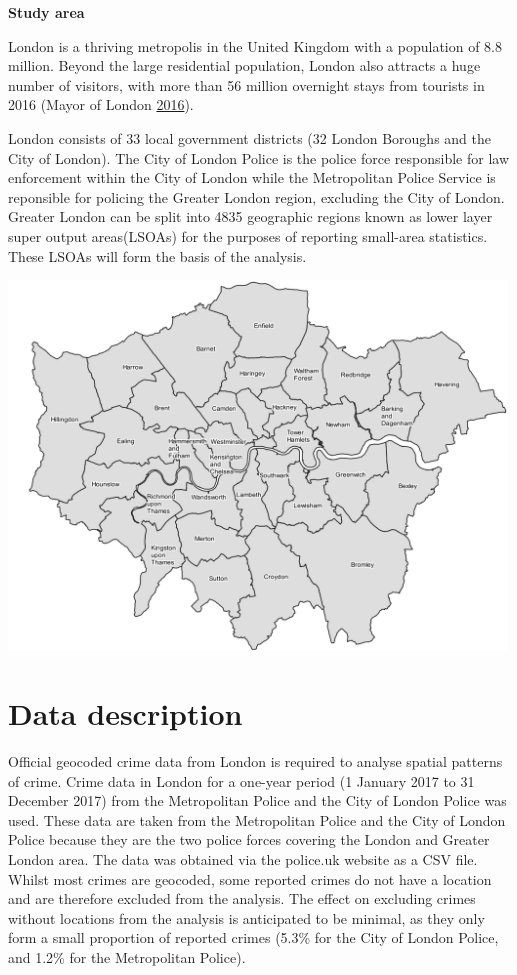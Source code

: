 \documentclass[]{article}
\theoremstyle{definition}
\theoremstyle{definition}
\theoremstyle{definition}
\theoremstyle{remark}
\begin{document}
\textbf{Study area}

London is a thriving metropolis in the United Kingdom with a population
of 8.8 million. Beyond the large residential population, London also
attracts a huge number of visitors, with more than 56 million overnight
stays from tourists in 2016 (Mayor of London
\protect\hyperlink{ref-MayorofLondon2016}{2016}).

London consists of 33 local government districts (32 London Boroughs and
the City of London). The City of London Police is the police force
responsible for law enforcement within the City of London while the
Metropolitan Police Service is reponsible for policing the Greater
London region, excluding the City of London. Greater London can be split
into 4835 geographic regions known as lower layer super output
areas(LSOAs) for the purposes of reporting small-area statistics. These
LSOAs will form the basis of the analysis.

\includegraphics[width=5.20833in]{pictures/London.png} \pagebreak

\section{Data description}\label{data-description}

Official geocoded crime data from London is required to analyse spatial
patterns of crime. Crime data in London for a one-year period (1 January
2017 to 31 December 2017) from the Metropolitan Police and the City of
London Police was used. These data are taken from the Metropolitan
Police and the City of London Police because they are the two police
forces covering the London and Greater London area. The data was
obtained via the police.uk website as a CSV file. Whilst most crimes are
geocoded, some reported crimes do not have a location and are therefore
excluded from the analysis. The effect on excluding crimes without
locations from the analysis is anticipated to be minimal, as they only
form a small proportion of reported crimes (5.3\% for the City of London
Police, and 1.2\% for the Metropolitan Police).
\end{document}
